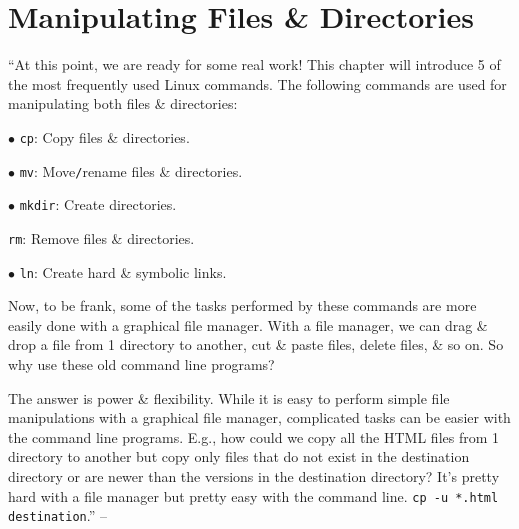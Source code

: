 \documentclass[oneside]{book}
\numberwithin{equation}{section}
\begin{document}
\section{Manipulating Files \& Directories}
``At this point, we are ready for some real work! This chapter will introduce 5 of the most frequently used Linux commands. The following commands are used for manipulating both files \& directories:
\begin{enumerate*}
	\item[$\bullet$] \texttt{cp}: Copy files \& directories.
	\item[$\bullet$] \texttt{mv}: Move\texttt{/}rename files \& directories.
	\item[$\bullet$] \texttt{mkdir}: Create directories.
	\item \texttt{rm}: Remove files \& directories.
	\item[$\bullet$] \texttt{ln}: Create hard \& symbolic links.
\end{enumerate*}

Now, to be frank, some of the tasks performed by these commands are more easily done with a graphical file manager. With a file manager, we can drag \& drop a file from 1 directory to another, cut \& paste files, delete files, \& so on. So why use these old command line programs?

The answer is power \& flexibility. While it is easy to perform simple file manipulations with a graphical file manager, complicated tasks can be easier with the command line programs. E.g., how could we copy all the HTML files from 1 directory to another but copy only files that do not exist in the destination directory or are newer than the versions in the destination directory? It's pretty hard with a file manager but pretty easy with the command line. \verb|cp -u *.html destination|.'' -- \cite[pp. 64--65]{Shotts2019}
\end{document}
